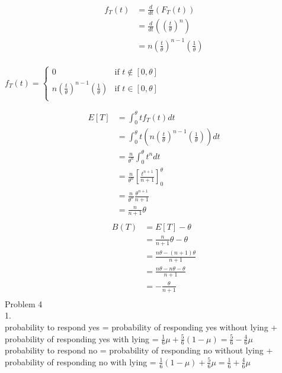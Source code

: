 \documentclass[12pt,border=4pt,multi]{article} %
\begin{document}
\begin{align*}
f_T(t) &= \frac{d}{dt}(F_T(t))\\ 
&= \frac{d}{dt}\left(\left(\frac{t}{\theta}\right)^n\right)\\
&= n \left(\frac{t}{\theta}\right)^{n - 1}\left(\frac{1}{\theta}\right)\\
\end{align*}
\begin{center}
{\large
$f_T(t) = 
\begin{cases}
0 & \text{if } t \not\in [0, \theta]\\
n \left(\frac{t}{\theta}\right)^{n - 1}\left(\frac{1}{\theta}\right) & \text{if } t \in [0, \theta]\\
\end{cases}$}
\end{center}
\begin{align*}
E[T] &= \int_0^\theta t f_T(t) dt\\
&= \int_0^\theta t \left(n\left(\frac{t}{\theta}\right)^{n - 1}\left(\frac{1}{\theta}\right)\right) dt\\
&= \frac{n}{\theta^n} \int_0^\theta t^n dt\\ 
&= \frac{n}{\theta^n} \left[\frac{t^{n + 1}}{n + 1}\right]_0^\theta\\
&= \frac{n}{\theta^n} \frac{\theta^{n + 1}}{n + 1}\\
&= \frac{n}{n + 1}\theta\\
\end{align*}
\begin{align*}
B(T) &= E[T] - \theta\\
&= \frac{n}{n + 1}\theta - \theta\\
&= \frac{n\theta - (n + 1)\theta}{n + 1}\\
&= \frac{n\theta - n\theta - \theta}{n + 1}\\
&= \boxed{-\frac{\theta}{n + 1}}\\
\end{align*}
\newpage
\noindent
Problem 4\\
1.\\
probability to respond yes = probability of responding yes without lying + probability of responding yes with lying = $\frac{1}{6}\mu + \frac{5}{6}(1 - \mu) = \frac{5}{6} - \frac{4}{6}\mu$\\
probability to respond no = probability of responding no without lying + probability of responding no with lying = $\frac{1}{6}(1 - \mu) + \frac{5}{6}\mu = \frac{1}{6} + \frac{4}{6}\mu$\\
\end{document}
